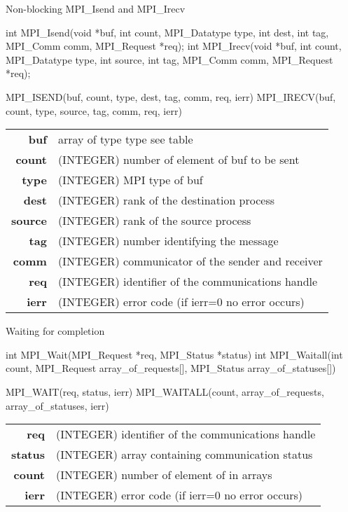 \documentclass[aspectratio=43]{beamer}
\begin{document}
\begin{frame}[fragile]{Non-blocking MPI\_Isend and MPI\_Irecv}
\begin{Cpplisting}[]{}
int MPI_Isend(void *buf, int count, MPI_Datatype type, int dest, int tag, MPI_Comm comm, MPI_Request *req);
int MPI_Irecv(void *buf, int count, MPI_Datatype type, int source, int tag, MPI_Comm comm, MPI_Request *req);
\end{Cpplisting}
\begin{Fortranlisting}[]{}
MPI_ISEND(buf, count, type, dest, tag, comm, req, ierr)
MPI_IRECV(buf, count, type, source, tag, comm, req, ierr)
\end{Fortranlisting}
\begin{black1block}{}
\begin{tabular}{rl}
    \textbf{buf} & array of type type see table\\
    \textbf{count} & (INTEGER) number of element of buf to be sent\\
    \textbf{type} & (INTEGER) MPI type of buf\\
    \textbf{dest} & (INTEGER) rank of the destination process\\
    \textbf{source} & (INTEGER) rank of the source process\\
    \textbf{tag} & (INTEGER) number identifying the message\\
    \textbf{comm} & (INTEGER) communicator of the sender and receiver\\
    \textbf{req} & (INTEGER) identifier of the communications handle\\
    \textbf{ierr} & (INTEGER) error code (if ierr=0 no error occurs)\\
\end{tabular}
\end{black1block}
\end{frame}

\begin{frame}[fragile]{Waiting for completion}
\begin{Cpplisting}[]{}
int MPI_Wait(MPI_Request *req, MPI_Status *status)
int MPI_Waitall(int count, MPI_Request array_of_requests[], MPI_Status array_of_statuses[])
\end{Cpplisting}
\begin{Fortranlisting}[]{}
MPI_WAIT(req, status, ierr)
MPI_WAITALL(count, array_of_requests, array_of_statuses, ierr)
\end{Fortranlisting}
\begin{black1block}{}
\begin{tabular}{rl}
    \textbf{req} & (INTEGER) identifier of the communications handle\\
    \textbf{status} & (INTEGER) array containing communication status\\
    \textbf{count} & (INTEGER) number of element of in arrays\\
    \textbf{ierr} & (INTEGER) error code (if ierr=0 no error occurs)\\
\end{tabular}
\end{black1block}
\end{frame}
\end{document}
